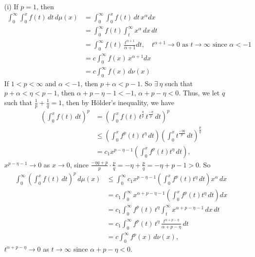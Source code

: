 \documentclass[a4paper,11pt]{article}
\begin{document}
	\begin{enumerate}
		\item [(i)]
			If $p = 1$, then
				$$\begin{aligned}
				\int_0^\infty \int_0^x f(t)\,dt\,d\mu(x)
				&= \int_0^\infty \int_0^x f(t)\,dt\,x^\alpha dx\\
				&= \int_0^\infty f(t) \int_t^\infty x^\alpha \,dx\,dt\\
				&= \int_0^\infty f(t) \, \frac{t^{\alpha+1}}{\alpha + 1} dt,
				\quad \text{$t^{\alpha + 1} \to 0$ as $t \to \infty$ since $\alpha < -1$}\\
				&= c \int_0^\infty f(x)\,x^{\alpha + 1} dx\\
				&= c \int_0^\infty f(x)\,d\nu(x)
				\end{aligned}$$
			If $1 < p < \infty$ and $\alpha < -1$, then $p + \alpha < p - 1$. So $\exists\,\eta$ such that $p + \alpha < \eta < p - 1$, then $\alpha + p - \eta - 1 < -1$, $\alpha + p - \eta < 0$. Thus, we let $q$ such that $\frac{1}{p} + \frac{1}{q} = 1$, then by H\"older's inequality, we have
				$$\begin{aligned}
				\left( \int_0^x f(t)\,dt \right)^p
				&= \left( \int_0^x f(t)\,t^{\frac{\eta}{p}}\,t^{\frac{-\eta}{p}}\,dt \right)^p\\
				&\leq \left( \int_0^x f^p(t) \,t^\eta\,dt\right) \left(\int_0^x t^{\frac{-\eta q}{p}}\,dt \right)^{\frac{p}{q}}\\
				&= c_1 x^{p - \eta - 1} \left( \int_0^x f^p(t) t^\eta\,dt \right),
				\end{aligned}$$
			$x^{p - \eta - 1} \to 0$ as $x \to 0$, since $\frac{-\eta q + p}{p} \cdot \frac{p}{q} = -\eta + \frac{p}{q} = -\eta + p - 1 > 0$. So
				$$\begin{aligned}
				\int_0^\infty (\int_0^x f(t)\,dt)^p\,d\mu(x)
				&\leq \int_0^\infty c_1 x^{p - \eta - 1} \left( \int_0^x f^p(t) t^\eta\,dt \right) x^\alpha\,dx\\
				&= c_1 \int_0^\infty x^{\alpha + p - \eta -1} \left( \int_0^x f^p(t) t^\eta\,dt \right) dx\\
				&= c_1 \int_0^\infty f^p(t)\,t^\eta \int_t^\infty x^{\alpha + p - \eta -1} \,dx\,dt\\
				&= c_1 \int_0^\infty f^p(t)\,t^\eta \, \frac{t^{\alpha + p - \eta}}{\alpha + p - \eta} \,dt\\
				&= c \int_0^\infty f^p(x) \,d\nu(x),
				\end{aligned}$$
			$t^{\alpha + p - \eta} \to 0$ as $t \to \infty$ since $\alpha + p - \eta < 0$.\\


\end{enumerate}
\end{document}
